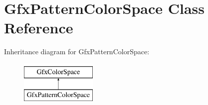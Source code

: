 \hypertarget{class_gfx_pattern_color_space}{}\section{Gfx\+Pattern\+Color\+Space Class Reference}
\label{class_gfx_pattern_color_space}
Inheritance diagram for Gfx\+Pattern\+Color\+Space\+:\begin{figure}[H]
\begin{center}
\leavevmode
\includegraphics[height=2.000000cm]{class_gfx_pattern_color_space}
\end{center}
\end{figure}
